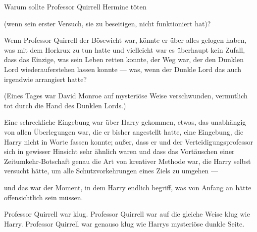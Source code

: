 Warum sollte Professor Quirrell Hermine töten

(wenn sein erster Versuch, sie zu beseitigen, nicht funktioniert hat)?

Wenn Professor Quirrell der Bösewicht war, könnte er über alles gelogen haben, was mit dem Horkrux zu tun hatte und vielleicht war es überhaupt kein Zufall, dass das Einzige, was sein Leben retten konnte, der Weg war, der den Dunklen Lord wiederauferstehen lassen konnte — was, wenn der Dunkle Lord das auch irgendwie arrangiert hatte?

(Eines Tages war David Monroe auf mysteriöse Weise verschwunden, vermutlich tot durch die Hand des Dunklen Lords.)

Eine schreckliche Eingebung war über Harry gekommen, etwas, das unabhängig von allen Überlegungen war, die er bisher angestellt hatte, eine Eingebung, die Harry nicht in Worte fassen konnte; außer, dass er und der Verteidigungsprofessor sich in gewisser Hinsicht sehr ähnlich waren und dass das Vortäuschen einer Zeitumkehr-Botschaft genau die Art von kreativer Methode war, die Harry selbst versucht hätte, um alle Schutzvorkehrungen eines Ziels zu umgehen —

und das war der Moment, in dem Harry endlich begriff, was von Anfang an hätte offensichtlich sein müssen.

\later

Professor Quirrell war klug.
Professor Quirrell war auf die gleiche Weise klug wie Harry.
Professor Quirrell war genauso klug wie Harrys mysteriöse dunkle Seite.

